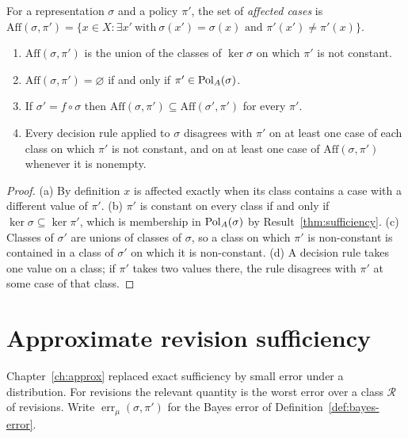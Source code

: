 \begin{definition}
For a representation $\sigma$ and a policy $\pi'$, the set of \emph{affected cases} is $\mathrm{Aff}(\sigma,\pi')=\{x\in X:\exists x'\ \text{with}\ \sigma(x')=\sigma(x)\text{ and }\pi'(x')\ne\pi'(x)\}$.
\end{definition}

\begin{newresult}\label{prop:affected}
\begin{enumerate}[nosep,label=(\alph*)]
  \item $\mathrm{Aff}(\sigma,\pi')$ is the union of the classes of $\ker\sigma$ on which $\pi'$ is not constant.
  \item $\mathrm{Aff}(\sigma,\pi')=\varnothing$ if and only if $\pi'\in\mathrm{Pol}_A(\sigma)$.
  \item If $\sigma'=f\circ\sigma$ then $\mathrm{Aff}(\sigma,\pi')\subseteq\mathrm{Aff}(\sigma',\pi')$ for every $\pi'$.
  \item Every decision rule applied to $\sigma$ disagrees with $\pi'$ on at least one case of each class on which $\pi'$ is not constant, and on at least one case of $\mathrm{Aff}(\sigma,\pi')$ whenever it is nonempty.
\end{enumerate}
\end{newresult}
\begin{proof}
(a) By definition $x$ is affected exactly when its class contains a case with a different value of $\pi'$. (b) $\pi'$ is constant on every class if and only if $\ker\sigma\subseteq\ker\pi'$, which is membership in $\mathrm{Pol}_A(\sigma)$ by Result~\ref{thm:sufficiency}. (c) Classes of $\sigma'$ are unions of classes of $\sigma$, so a class on which $\pi'$ is non-constant is contained in a class of $\sigma'$ on which it is non-constant. (d) A decision rule takes one value on a class; if $\pi'$ takes two values there, the rule disagrees with $\pi'$ at some case of that class.
\end{proof}

\section{Approximate revision sufficiency}

Chapter~\ref{ch:approx} replaced exact sufficiency by small error under a distribution. For revisions the relevant quantity is the worst error over a class $\mathcal R$ of revisions. Write $\operatorname{err}_\mu(\sigma,\pi')$ for the Bayes error of Definition~\ref{def:bayes-error}.

